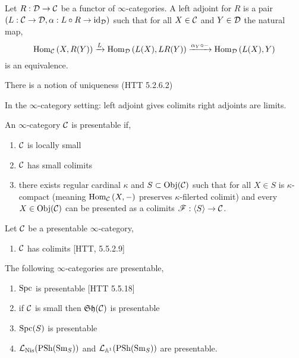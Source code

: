 \documentclass[12pt]{article}
\begin{document}
\begin{defn}
Let $R : \mathcal{D} \to \mathcal{C}$ be a functor of $\infty$-categories. A left adjoint for $R$ is a pair $(L : \mathcal{C} \to \mathcal{D}, \alpha : L \circ R \to \mathrm{id}_{\mathcal{D}})$ such that for all $X \in \mathcal{C}$ and $Y \in \mathcal{D}$ the natural map,
\[ \mathrm{Hom}_{\mathcal{C}} \left( X, R(Y) \right) \xrightarrow{L} \mathrm{Hom}_{\mathcal{D}} \left( L(X), LR(Y) \right) \xrightarrow{\alpha_Y \circ -} \mathrm{Hom}_{\mathcal{D}} \left( L(X), Y \right) \]
is an equivalence. 
\end{defn}

\begin{rmk}
There is a notion of uniqueness (HTT 5.2.6.2)
\end{rmk}


\begin{rmk}
In the $\infty$-category setting: left adjoint gives colimits right adjoints are limits.
\end{rmk}

\begin{defn}
An $\infty$-category $\mathcal{C}$ is presentable if,
\begin{enumerate}
\item $\mathcal{C}$ is locally small
\item $\mathcal{C}$ has small colimits
\item there exists regular cardinal $\kappa$ and $S \subset \mathrm{Obj}(\mathcal{C})$ such that for all $X \in S$ is $\kappa$-compact (meaning $\mathrm{Hom}_{\mathcal{C}} \left( X, - \right)$ preserves $\kappa$-filerted colimit) and every $X \in \mathrm{Obj}(\mathcal{C})$ can be presented as a colimits $\mathscr{F} : \left< S \right> \to \mathcal{C}$.
\end{enumerate}
\end{defn}

\begin{prop}
Let $\mathcal{C}$ be a presentable $\infty$-category,
\begin{enumerate}
\item $\mathcal{C}$ has colimits [HTT, 5.5.2.9]
\end{enumerate}
\end{prop}

\begin{prop}
The following $\infty$-categories are presentable,
\begin{enumerate}
\item $\mathrm{Spc}$ is presentable [HTT 5.5.18]
\item if $\mathcal{C}$ is small then $\mathfrak{Sh}(\mathcal{C})$ is presentable

\item $\mathrm{Spc}(S)$ is presentable
\item $\mathcal{L}_{\mathrm{Nis}}(\mathrm{PSh}(\mathrm{Sm}_S))$ and $\mathcal{L}_{\mathbb{A}^1}(\mathrm{PSh}(\mathrm{Sm}_S))$ are presentable.
\end{enumerate}
\end{prop}
\end{document}
